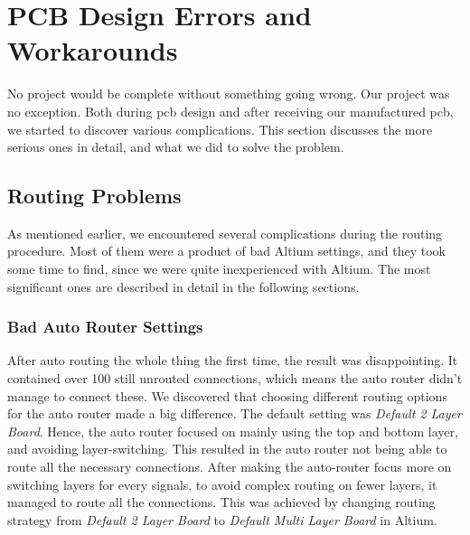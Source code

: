 \section{PCB Design Errors and Workarounds}
No project would be complete without something going wrong. Our project was no exception. Both during \gls{pcb} design and after receiving our manufactured \gls{pcb}, we started to discover various complications. This section discusses the more serious ones in detail, and what we did to solve the problem.

\subsection{Routing Problems}
\label{Routing Problems}
As mentioned earlier, we encountered several complications during the routing procedure. Most of them were a product of bad Altium settings, and they took some time to find, since we were quite inexperienced with Altium.
The most significant ones are described in detail in the following sections.

\subsubsection{Bad Auto Router Settings}
After auto routing the whole thing the first time, the result was disappointing. It contained over 100 still unrouted connections, which means the auto router didn't manage to connect these.
\newline
\newline
We discovered that choosing different routing options for the auto router made a big difference. The default setting was \emph{Default 2 Layer Board}. Hence, the auto router focused on mainly using the top and bottom layer, and avoiding layer-switching. This resulted in the auto router not being able to route all the necessary connections.
\newline
\newline
After making the auto-router focus more on switching layers for every signals, to avoid complex routing on fewer layers, it managed to route all the connections. This was achieved by changing routing strategy from \emph{Default 2 Layer Board} to \emph{Default Multi Layer Board} in Altium.

